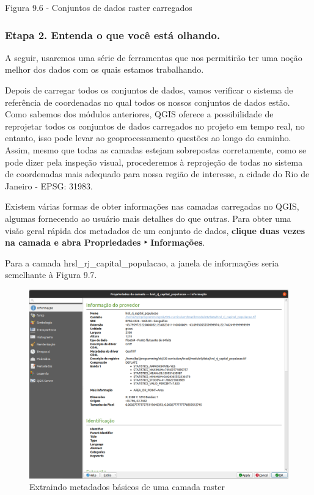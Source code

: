 \documentclass[
]{book}
\begin{document}
Figura 9.6 - Conjuntos de dados raster carregados

\hypertarget{etapa-2.-entenda-o-que-vocuxea-estuxe1-olhando.-1}{%
\subsubsection{\texorpdfstring{\textbf{Etapa 2. Entenda o que você está olhando.}}{Etapa 2. Entenda o que você está olhando.}}\label{etapa-2.-entenda-o-que-vocuxea-estuxe1-olhando.-1}}

A seguir, usaremos uma série de ferramentas que nos permitirão ter uma noção melhor dos dados com os quais estamos trabalhando.

Depois de carregar todos os conjuntos de dados, vamos verificar o sistema de referência de coordenadas no qual todos os nossos conjuntos de dados estão. Como sabemos dos módulos anteriores, QGIS oferece a possibilidade de reprojetar todos os conjuntos de dados carregados no projeto em tempo real, no entanto, isso pode levar ao geoprocessamento questões ao longo do caminho. Assim, mesmo que todas as camadas estejam sobrepostas corretamente, como se pode dizer pela inspeção visual, procederemos à reprojeção de todas no sistema de coordenadas mais adequado para nossa região de interesse, a cidade do Rio de Janeiro - EPSG: 31983.

Existem várias formas de obter informações nas camadas carregadas no QGIS, algumas fornecendo ao usuário mais detalhes do que outras. Para obter uma visão geral rápida dos metadados de um conjunto de dados, \textbf{clique duas vezes na camada e abra Propriedades ‣ Informações}.

Para a camada hrsl\_rj\_capital\_populacao, a janela de informações seria semelhante à Figura 9.7.

\begin{figure}
\centering
\includegraphics{media/modulo9/fig97.png}
\caption{Extraindo metadados básicos de uma camada raster}
\end{figure}
\end{document}

